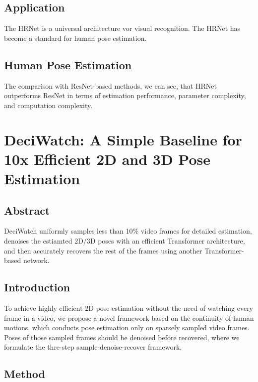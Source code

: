 \documentclass[a4paper]{report}
\begin{document}
\section*{Application}
The HRNet is a universal architecture vor visual recognition. The HRNet has become a standard for human pose estimation.

\section*{Human Pose Estimation}
The comparison with ResNet-based methods, we can see, that HRNet outperforms ResNet in terms of estimation performance, parameter complexity, and computation complexity.

\chapter*{DeciWatch: A Simple Baseline for 10x Efficient 2D and 3D Pose Estimation}
\section*{Abstract}
DeciWatch uniformly samples less than 10\% video frames for detailed estimation, denoises the estiamted 2D/3D poses with an efficient Transformer architecture, and then accurately recovers the rest of the frames using another Transformer-based network.

\section*{Introduction}
To achieve highly efficient 2D pose estimation without the need of watching every frame in a video, we propose a novel framework based on the continuity of human motions, which conducts pose estimation only on sparsely sampled video frames. Poses of those sampled frames should be denoised before recovered, where we formulate the thre-step sample-denoise-recover framework.

\section*{Method}
\end{document}
